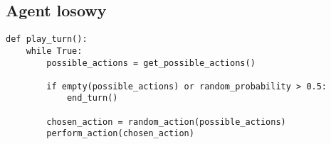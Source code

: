 \subsection{Agent losowy}

\begin{verbatim}
def play_turn():
	while True:
		possible_actions = get_possible_actions()
		
		if empty(possible_actions) or random_probability > 0.5:
			end_turn()
	
		chosen_action = random_action(possible_actions)
		perform_action(chosen_action)
\end{verbatim}